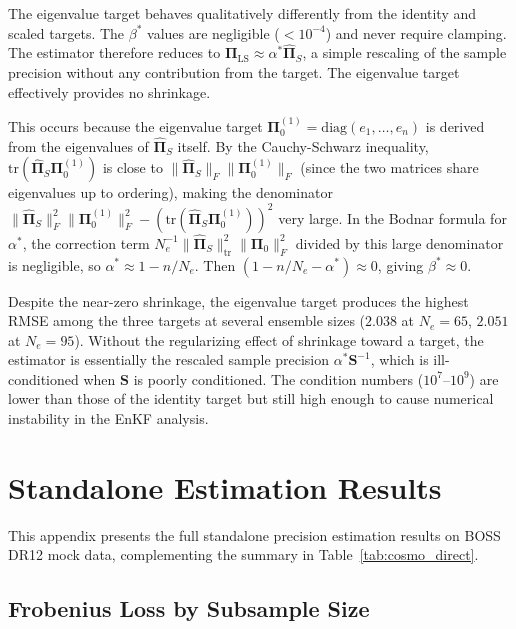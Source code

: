 The eigenvalue target behaves qualitatively differently from the identity and scaled targets. The $\beta^*$ values are negligible ($< 10^{-4}$) and never require clamping. The estimator therefore reduces to $\boldsymbol{\Pi}_{\text{LS}} \approx \alpha^* \hat{\boldsymbol{\Pi}}_S$, a simple rescaling of the sample precision without any contribution from the target. The eigenvalue target effectively provides no shrinkage.

This occurs because the eigenvalue target $\boldsymbol{\Pi}_0^{(1)} = \text{diag}(e_1, \ldots, e_n)$ is derived from the eigenvalues of $\hat{\boldsymbol{\Pi}}_S$ itself. By the Cauchy-Schwarz inequality, $\text{tr}(\hat{\boldsymbol{\Pi}}_S \boldsymbol{\Pi}_0^{(1)})$ is close to $\|\hat{\boldsymbol{\Pi}}_S\|_F \|\boldsymbol{\Pi}_0^{(1)}\|_F$ (since the two matrices share eigenvalues up to ordering), making the denominator $\|\hat{\boldsymbol{\Pi}}_S\|_F^2 \|\boldsymbol{\Pi}_0^{(1)}\|_F^2 - (\text{tr}(\hat{\boldsymbol{\Pi}}_S \boldsymbol{\Pi}_0^{(1)}))^2$ very large. In the Bodnar formula for $\alpha^*$, the correction term $N_e^{-1} \|\hat{\boldsymbol{\Pi}}_S\|_{\text{tr}}^2 \|\boldsymbol{\Pi}_0\|_F^2$ divided by this large denominator is negligible, so $\alpha^* \approx 1 - n/N_e$. Then $(1 - n/N_e - \alpha^*) \approx 0$, giving $\beta^* \approx 0$.

Despite the near-zero shrinkage, the eigenvalue target produces the highest RMSE among the three targets at several ensemble sizes ($2.038$ at $N_e = 65$, $2.051$ at $N_e = 95$). Without the regularizing effect of shrinkage toward a target, the estimator is essentially the rescaled sample precision $\alpha^* \mathbf{S}^{-1}$, which is ill-conditioned when $\mathbf{S}$ is poorly conditioned. The condition numbers ($10^7$--$10^9$) are lower than those of the identity target but still high enough to cause numerical instability in the EnKF analysis.

\chapter{Standalone Estimation Results}
\label{app:standalone}

This appendix presents the full standalone precision estimation results on BOSS DR12 mock data, complementing the summary in Table~\ref{tab:cosmo_direct}.

\section{Frobenius Loss by Subsample Size}

